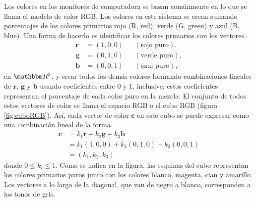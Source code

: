 \begin{adjustwidth}{-7.6cm}{-2cm}
    \begin{tcolorbox}[
        theorem style=change break,
        enhanced,
        breakable,
        boxrule=0pt,
        frame hidden,
        left = 1.8cm,
        right = 1.8cm,
        top=4mm,
        bottom=2mm,
        colback=cw2,
        coltitle=cw0,
        attach title to upper={\ },
        sharp corners,
        borderline north={1.5pt}{0pt}{cw0},
        title = {Aplicación de combinaciones lineales a modelos de color:},
        fonttitle=\selectfont\Lato\bfseries\LARGE,
        fontupper=\normalsize
    ]
        \begin{multicols}{2}
            Los colores en los monitores de computadora se basan comúnmente en lo que se llama el modelo de color RGB. Los colores en este sistema se crean sumando porcentajes de los colores primarios rojo (R, red), verde (G, green) y azul (B, blue). Una forma de hacerlo es identificar los colores primarios con los vectores.
            \begin{align*}
                \mathbf{r} & = (1, 0, 0) && (\text{rojo puro}), \\
                \mathbf{g} & = (0, 1, 0) && (\text{verde puro}), \\
                \mathbf{b} & = (0, 0, 1) && (\text{azul puro}),
            \end{align*}
            en $\RR[3]$, y crear todos los demás colores formando combinaciones lineales de $\mathbf{r}$, $\mathbf{g}$ y $\mathbf{b}$ usando coeficientes entre 0 y 1, inclusive; estos coeficientes representan el porcentaje de cada color puro en la mezcla. El conjunto de todos estos vectores de color se llama el espacio RGB o el cubo RGB (figura \ref{fig:cuboRGB}). Así, cada vector de color $\mathbf{c}$ en este cubo se puede expresar como una combinación lineal de la forma
            \begin{align*}
                \mathbf{c} & = k_1\mathbf{r} + k_2\mathbf{g} + k_3\mathbf{b} \\
                & = k_1(1, 0, 0) + k_2(0, 1, 0) + k_3(0, 0, 1) \\
                & = (k_1, k_2, k_3)
            \end{align*}
            donde $0 \leq k_i \leq 1$. Como se indica en la figura, las esquinas del cubo representan los colores primarios puros junto con los colores blanco, magenta, cian y amarillo. Los vectores a lo largo de la diagonal, que van de negro a blanco, corresponden a los tonos de gris.

\end{multicols}
\end{tcolorbox}
\end{adjustwidth}

